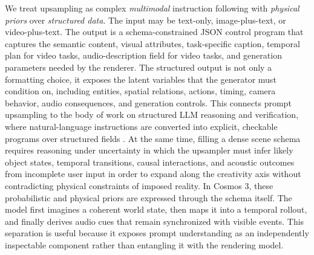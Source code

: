 We treat upsampling as complex \emph{multimodal} instruction following with \emph{physical priors} over \emph{structured data}. The input may be text-only, image-plus-text, or video-plus-text. The output is a schema-constrained JSON control program that captures the semantic content, visual attributes, task-specific caption, temporal plan for video tasks, audio-description field for video tasks, and generation parameters needed by the renderer. The structured output is not only a formatting choice, it exposes the latent variables that the generator must condition on, including entities, spatial relations, actions, timing, camera behavior, audio consequences, and generation controls. This connects prompt upsampling to the body of work on structured LLM reasoning and verification, where natural-language instructions are converted into explicit, checkable programs over structured fields \citep{chegini-etal-2025-repanda}. At the same time, filling a dense scene schema requires reasoning under uncertainty in which the upsampler must infer likely object states, temporal transitions, causal interactions, and acoustic outcomes from incomplete user input \citep{pournemat2025reasoning} in order to expand along the creativity axis without contradicting physical constraints of imposed reality. In Cosmos 3, these probabilistic and physical priors are expressed through the schema itself. The model first imagines a coherent world state, then maps it into a temporal rollout, and finally derives audio cues that remain synchronized with visible events. This separation is useful because it exposes prompt understanding as an independently inspectable component rather than entangling it with the rendering model.

